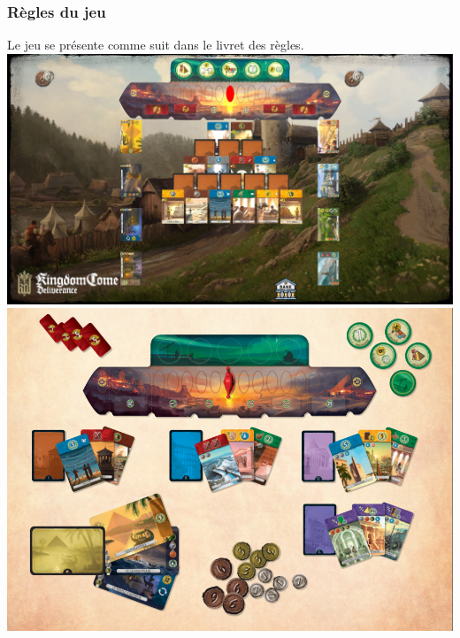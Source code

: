 \documentclass[a4paper, 12pt, french]{article}
\begin{document}
	\subsubsection{Règles du jeu}
	Le jeu se présente comme suit dans le livret des règles\cite{regle_7_wonder_duel}.
	\\
	\includegraphics[width=15cm]{images/plateauDebutPartie}
	\includegraphics[width=15cm]{images/contenueDuJeu}
	\\
\end{document}
